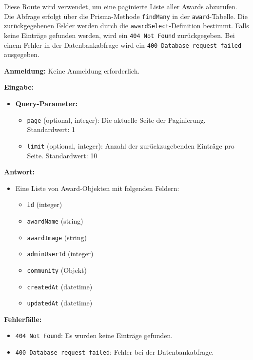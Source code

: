 \documentclass[a4paper,12pt]{article}
\begin{document}
Diese Route wird verwendet, um eine paginierte Liste aller Awards abzurufen.
Die Abfrage erfolgt über die Prisma-Methode \texttt{findMany} in der
\texttt{award}-Tabelle. Die zurückgegebenen Felder werden durch die
\texttt{awardSelect}-Definition bestimmt. Falls keine Einträge gefunden werden,
wird ein \texttt{404 Not Found} zurückgegeben. Bei einem Fehler in der
Datenbankabfrage wird ein \texttt{400 Database request failed} ausgegeben.

\textbf{Anmeldung:} Keine Anmeldung erforderlich.

\textbf{Eingabe:}
\begin{itemize}
    \item \textbf{Query-Parameter:}
    \begin{itemize}
        \item \texttt{page} (optional, integer):
            Die aktuelle Seite der Paginierung. Standardwert: 1
        \item \texttt{limit} (optional, integer):
            Anzahl der zurückzugebenden Einträge pro Seite. Standardwert: 10
    \end{itemize}
\end{itemize}

\textbf{Antwort:}
\begin{itemize}
    \item Eine Liste von Award-Objekten mit folgenden Feldern:
    \begin{itemize}
        \item \texttt{id} (integer)
        \item \texttt{awardName} (string)
        \item \texttt{awardImage} (string)
        \item \texttt{adminUserId} (integer)
        \item \texttt{community} (Objekt)
        \item \texttt{createdAt} (datetime)
        \item \texttt{updatedAt} (datetime)
    \end{itemize}
\end{itemize}

\textbf{Fehlerfälle:}
\begin{itemize}
    \item \texttt{404 Not Found}:
        Es wurden keine Einträge gefunden.
    \item \texttt{400 Database request failed}:
        Fehler bei der Datenbankabfrage.
\end{itemize}
\end{document}
